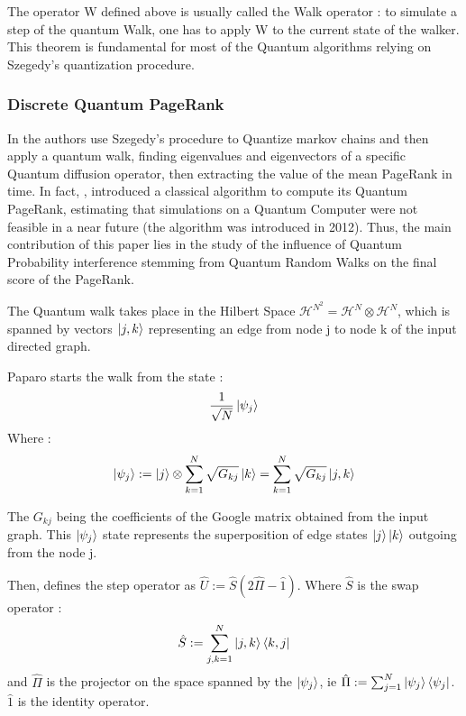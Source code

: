 \documentclass[sn-mathphys]{sn-jnl}%
\theoremstyle{thmstyleone}%
\theoremstyle{thmstyletwo}%
\theoremstyle{thmstylethree}%
\begin{document}
The operator W defined above is usually called the Walk operator : to
simulate a step of the quantum Walk, one has to apply W to the current
state of the walker. This theorem is fundamental for most of the
Quantum algorithms relying on Szegedy's quantization procedure.

\subsubsection{Discrete Quantum PageRank} 
\label{subsubsection:Paparo_quantum_walk}
In \cite{paparo_martin-delgado_2012} the authors use Szegedy’s
procedure \cite{szegedy} to Quantize markov chains and then apply a
quantum walk, finding eigenvalues and eigenvectors of a specific
Quantum diffusion operator, then extracting the value of the mean
PageRank in time. In fact, \cite{paparo_martin-delgado_2012},
introduced a classical algorithm to compute its Quantum PageRank,
estimating that simulations on a Quantum Computer were not feasible in
a near future (the algorithm was introduced in 2012). Thus, the main
contribution of this paper lies in the study of the influence of
Quantum Probability interference stemming from Quantum Random Walks on
the final score of the PageRank.

The Quantum walk takes place in the Hilbert Space
$\mathcal{H}^{N^2} = \mathcal{H}^{N} \otimes \mathcal{H}^{N}$, which
is spanned by vectors $\ket{j,k}$ representing an edge from node j to
node k of the input directed graph.

Paparo \cite{paparo_martin-delgado_2012} starts the walk from the state :
\begin{equation*}
    \frac{1}{\sqrt{N}}\ket{\psi_j}
\end{equation*}
Where :
\begin{equation*}
    \ket{\psi_j} := \ket{j} \otimes \sum_{k=1}^N \sqrt{G_{kj}} \ket{k} = \sum_{k=1}^N \sqrt{G_{kj}} \ket{j,k}
\end{equation*}

The $G_{kj}$ being the coefficients of the Google matrix obtained from
the input graph.  This $\ket{\psi_j}$ state represents the
superposition of edge states $\ket{j} \ket{k}$ outgoing from the node
j.

Then, \cite{paparo_martin-delgado_2012} defines the step operator as
$\hat{U} := \hat{S} (2 \hat{ \Pi} - \hat{{1}})$. Where $\hat{S}$ is
the swap operator :
\begin{equation*}
    \hat{S} := \sum_{j,k=1}^N \ket{j,k}\bra{k,j}
\end{equation*}
and $\hat{\Pi}$ is the projector on the space spanned by the
$\ket{\psi_j}$, ie
$\hat{\Pi} := \sum_{j=1}^N \ket{\psi_j}\bra{\psi_j}$. $\hat{1}$ is the
identity operator.
\end{document}
